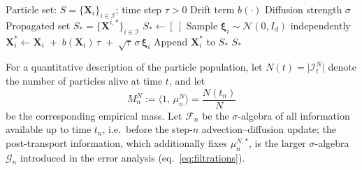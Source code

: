 \documentclass[a4paper,fleqn]{cas-sc}
\theoremstyle{definition}
\theoremstyle{remark}
\begin{document}
\begin{algorithm}
\caption{SDE propagation of the advection--diffusion step}\label{alg:sde}
\begin{algorithmic}
\Require Particle set: $S=\{\mathbf{X}_i\}_{i\in\mathcal I}$; time step $\tau>0$
\Require Drift term $b(\cdot)$
\Require Diffusion strength $\sigma$
\Ensure Propagated set $S_*=\{\mathbf{X}^{i,*}\}_{i\in\mathcal I}$
  \State $S_{*}\gets [\ ]$
    \State Sample $\boldsymbol{\xi}_i \sim \mathcal N(0,I_d)$ independently
    \State $\mathbf{X}^*_i \gets \mathbf{X}_i \;+\; b(\mathbf{X}_i)\,\tau \;+\; \sqrt{\tau}\,\sigma\,\boldsymbol{\xi}_i$
    \State Append $\mathbf{X}^{*}_i$ to $S_{*}$
  \EndFor
  \State \Return $S_{*}$
\EndProcedure
\end{algorithmic}
\end{algorithm}

For a quantitative description of the particle population, let
$N(t)=\lvert\mathcal I^N_t\rvert$ denote the number of particles alive at
time $t$, and let
\[
   M^N_n := \big\langle 1,\,\mu^N_n\big\rangle
   =\frac{N(t_n)}{N}
\]
be the corresponding empirical mass. Let $\mathcal F_n$ be the
$\sigma$-algebra of all information available up to time $t_n$, i.e.\ before the
step-$n$ advection--diffusion update; the post-transport information, which
additionally fixes $\mu^{N,*}_n$, is the larger $\sigma$-algebra $\mathcal G_n$
introduced in the error analysis (eq.~\eqref{eq:filtrations}).
\end{document}
